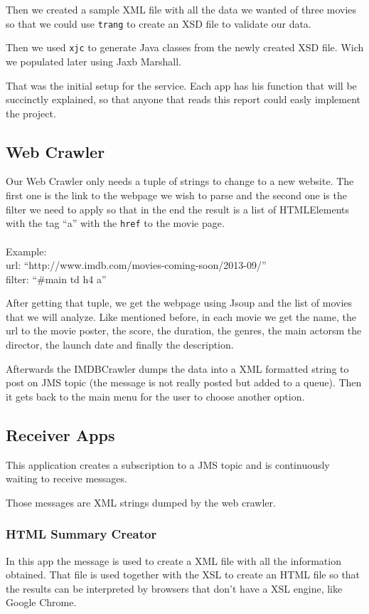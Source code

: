 \documentclass[a4paper]{article}
\begin{document}
Then we created a sample XML file with all the data we wanted of three movies so that we could use \texttt{trang} to create an XSD file to validate our data.

Then we used \texttt{xjc} to generate Java classes from the newly created XSD file. Wich we populated later using Jaxb Marshall.

That was the initial setup for the service. Each app has his function that will be succinctly explained, so that anyone that reads this report could easly implement the project.

\subsection{Web Crawler}
\indent \indent Our Web Crawler only needs a tuple of strings to change to a new website. The first one is the link to the webpage we wish to parse and the second one is the filter we need to apply so that in the end the result is a list of HTMLElements with the tag ``a'' with the \texttt{href} to the movie page.\\
\\Example:\\url: ``http://www.imdb.com/movies-coming-soon/2013-09/''\\filter: ``\#main td h4 a''

After getting that tuple, we get the webpage using Jsoup and the list of movies that we will analyze. Like mentioned before, in each movie we get the name, the url to the movie poster, the score, the duration, the genres, the main actorsm the director, the launch date and finally the description.

Afterwards the IMDBCrawler dumps the data into a XML formatted string to post on JMS topic (the message is not really posted but added to a queue). Then it gets back to the main menu for the user to choose another option.

\clearpage
\subsection{Receiver Apps}
\indent \indent This application creates a subscription to a JMS topic and is continuously waiting to receive messages.

Those messages are XML strings dumped by the web crawler.
\subsubsection{HTML Summary Creator}
\indent \indent In this app the message is used to create a XML file with all the information obtained. That file is used together with the XSL to create an HTML file so that the results can be interpreted by browsers that don't have a XSL engine, like Google Chrome.
\end{document}
